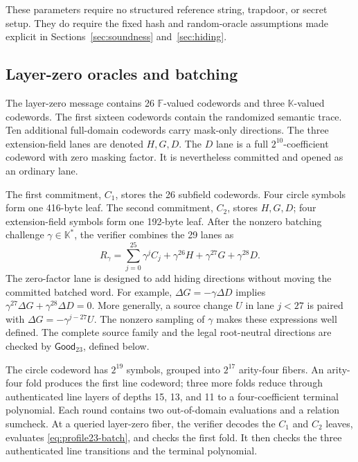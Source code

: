 These parameters require no structured reference string, trapdoor, or secret
setup.  They do require the fixed hash and random-oracle assumptions made
explicit in Sections~\ref{sec:soundness} and~\ref{sec:hiding}.

\subsection{Layer-zero oracles and batching}

The layer-zero message contains 26 \(\mathbb F\)-valued codewords and three
\(\mathbb K\)-valued codewords.  The first sixteen codewords contain the
randomized semantic trace.  Ten additional full-domain codewords carry
mask-only directions.  The three extension-field lanes are denoted
\(H,G,D\).  The \(D\) lane is a full \(2^{10}\)-coefficient codeword with
zero masking factor.  It is nevertheless committed and opened as an ordinary
lane.

The first commitment, \(C_1\), stores the 26 subfield codewords.  Four circle
symbols form one 416-byte leaf.  The second commitment, \(C_2\), stores
\(H,G,D\); four extension-field symbols form one 192-byte leaf.  After the
nonzero batching challenge \(\gamma\in\mathbb K^*\), the verifier combines
the 29 lanes as
\begin{equation}
 R_\gamma=\sum_{j=0}^{25}\gamma^j C_j
              +\gamma^{26}H+\gamma^{27}G+\gamma^{28}D.
 \label{eq:profile23-batch}
\end{equation}
The zero-factor lane is designed to add hiding directions without moving the
committed batched word.  For example,
\(
  \Delta G=-\gamma\Delta D
\)
implies
\(
 \gamma^{27}\Delta G+\gamma^{28}\Delta D=0
\).
More generally, a source change \(U\) in lane \(j<27\) is paired with
\(\Delta G=-\gamma^{j-27}U\).  The nonzero sampling of \(\gamma\) makes these
expressions well defined.  The complete source family and the legal
root-neutral directions are checked by \(\mathsf{Good}_{23}\), defined below.

The circle codeword has \(2^{19}\) symbols, grouped into \(2^{17}\)
arity-four fibers.  An arity-four fold produces the first line codeword; three
more folds reduce through authenticated line layers of depths 15, 13, and 11
to a four-coefficient terminal polynomial.  Each round contains two
out-of-domain evaluations and a relation sumcheck.  At a queried layer-zero
fiber, the verifier decodes the \(C_1\) and \(C_2\) leaves, evaluates
\eqref{eq:profile23-batch}, and checks the first fold.  It then checks the
three authenticated line transitions and the terminal polynomial.

